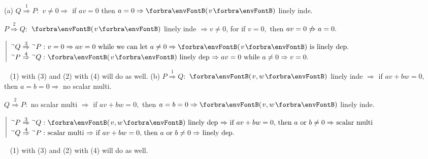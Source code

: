 \vfill{}

\vspace{6pt}

\par\quad
(a) $Q\overset{1}{\Rightarrow} P:$ $v\neq 0\Rightarrow$ if $av=0$ then $a=0\Rightarrow\Par{v}$ linely inde.\par\quad\Ha
$P\overset{2}{\Rightarrow} Q:$ $\Par{v}$ linely inde $\Rightarrow v\neq 0$, for if $v=0,$ then $av=0\notRightarrow a=0.$\par\vspace{2pt}\quad\Ha
\Or $\MathLeftMid{l}{{}^\neg Q\overset{3}{\Rightarrow}{}^\neg P:$ $v=0\Rightarrow av=0$ while we can let $a\neq 0\Rightarrow\Par{v}$ is linely dep.$\\ {}^\neg P\overset{4}{\Rightarrow}{}^\neg Q:$ $\Par{v}$ linely dep $\Rightarrow av=0$ while $a\neq 0\Rightarrow v=0.$
$}$\par\vspace{4pt}\quad\Ha
\Comment\,\,\, (1) with (3) and (2) with (4) will do as well.\PfEnd\vspace{6pt}\quad
(b) $P\overset{1}{\Rightarrow}Q:$ $\Par{v,w}$ linely inde $\Rightarrow$  if $av+bw=0,$ then $a=b=0\Rightarrow$ no scalar multi.\par\quad\Hb
$Q\overset{2}{\Rightarrow} P:$ no scalar multi $\Rightarrow$ if $av+bw=0,$ then $a=b=0\Rightarrow\Par{v,w}$ linely inde.\par\vspace{2pt}\quad\Hb
\Or $\MathLeftMid{l}{{}^\neg P\overset{3}{\Rightarrow}{}^\neg Q:$ $\Par{v,w}$ linely dep $\Rightarrow$ if $av+bw=0,$ then $a$ or $b\neq 0\Rightarrow$ scalar multi $\\{}^\neg Q\overset{4}{\Rightarrow}{}^\neg P:$ scalar multi $\Rightarrow$ if $av+bw=0,$ then $a$ or $b\neq 0\Rightarrow$ linely dep. $}$
\par\vspace{4pt}\quad\Hb
\Comment\,\,\, (1) with (3) and (2) with (4) will do as well.\PfEnd
\SepLine\pagebreak

